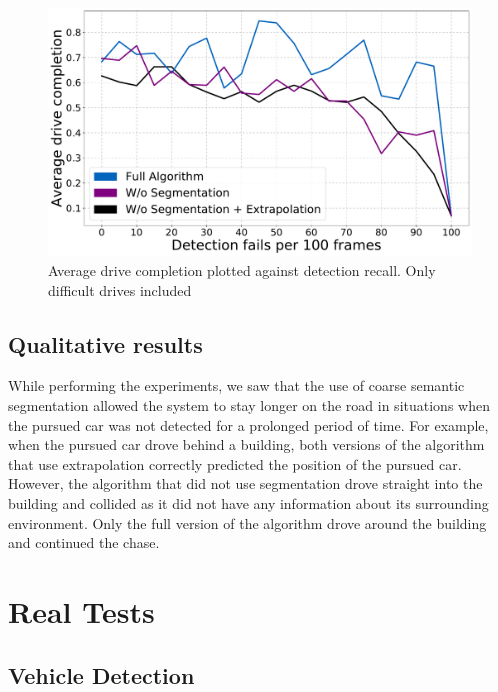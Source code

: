 \documentclass{ctuthesis/ctuthesis}
\begin{document}
\begin{figure}[]
    \centering
    \includegraphics[width=1\textwidth]{images/recall_chart7_difficult.pdf}
    
    \caption{Average drive completion plotted against detection recall. Only difficult drives included}\label{f:detection_recall_difficult}
\end{figure}


\subsection{Qualitative results}
While performing the experiments, we saw that the use of coarse semantic segmentation allowed the system to stay longer on the road in situations when the pursued car was not detected for a prolonged period of time. For example, when the pursued car drove behind a building, both versions of the algorithm that use extrapolation correctly predicted the position of the pursued car. However, the algorithm that did not use segmentation drove straight into the building and collided as it did not have any information about its surrounding environment. Only the full version of the algorithm drove around the building and continued the chase.




\section{Real Tests}
\subsection{Vehicle Detection}
\end{document}
